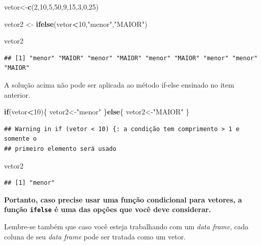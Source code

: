 \documentclass[
]{book}
\newenvironment{Shaded}{\begin{snugshade}}{\end{snugshade}}
\newcommand{\ControlFlowTok}[1]{\textcolor[rgb]{0.13,0.29,0.53}{\textbf{#1}}}
\newcommand{\DecValTok}[1]{\textcolor[rgb]{0.00,0.00,0.81}{#1}}
\newcommand{\KeywordTok}[1]{\textcolor[rgb]{0.13,0.29,0.53}{\textbf{#1}}}
\newcommand{\NormalTok}[1]{#1}
\newcommand{\OperatorTok}[1]{\textcolor[rgb]{0.81,0.36,0.00}{\textbf{#1}}}
\newcommand{\StringTok}[1]{\textcolor[rgb]{0.31,0.60,0.02}{#1}}
\begin{document}
\begin{Shaded}
\begin{Highlighting}[]
\NormalTok{vetor<-}\KeywordTok{c}\NormalTok{(}\DecValTok{2}\NormalTok{,}\DecValTok{10}\NormalTok{,}\DecValTok{5}\NormalTok{,}\DecValTok{50}\NormalTok{,}\DecValTok{9}\NormalTok{,}\DecValTok{15}\NormalTok{,}\DecValTok{3}\NormalTok{,}\DecValTok{0}\NormalTok{,}\DecValTok{25}\NormalTok{)}

\NormalTok{vetor2 <-}\StringTok{ }\KeywordTok{ifelse}\NormalTok{(vetor}\OperatorTok{<}\DecValTok{10}\NormalTok{,}\StringTok{"menor"}\NormalTok{,}\StringTok{"MAIOR"}\NormalTok{)}

\NormalTok{vetor2}
\end{Highlighting}
\end{Shaded}

\begin{verbatim}
## [1] "menor" "MAIOR" "menor" "MAIOR" "menor" "MAIOR" "menor" "menor" "MAIOR"
\end{verbatim}

A solução acima não pode ser aplicada ao método if-else ensinado no item
anterior.

\begin{Shaded}
\begin{Highlighting}[]
\ControlFlowTok{if}\NormalTok{(vetor}\OperatorTok{<}\DecValTok{10}\NormalTok{)\{}
\NormalTok{  vetor2<-}\StringTok{"menor"}
\NormalTok{\}}\ControlFlowTok{else}\NormalTok{\{}
\NormalTok{  vetor2<-}\StringTok{"MAIOR"}
\NormalTok{\}}
\end{Highlighting}
\end{Shaded}

\begin{verbatim}
## Warning in if (vetor < 10) {: a condição tem comprimento > 1 e somente o
## primeiro elemento será usado
\end{verbatim}

\begin{Shaded}
\begin{Highlighting}[]
\NormalTok{vetor2  }
\end{Highlighting}
\end{Shaded}

\begin{verbatim}
## [1] "menor"
\end{verbatim}

\textbf{Portanto, caso precise usar uma função condicional para vetores,
a função \texttt{ifelse} é uma das opções que você deve considerar.}

Lembre-se também que caso você esteja trabalhando com um \emph{data
frame}, cada coluna de seu \emph{data frame} pode ser tratada como um
vetor.
\end{document}
